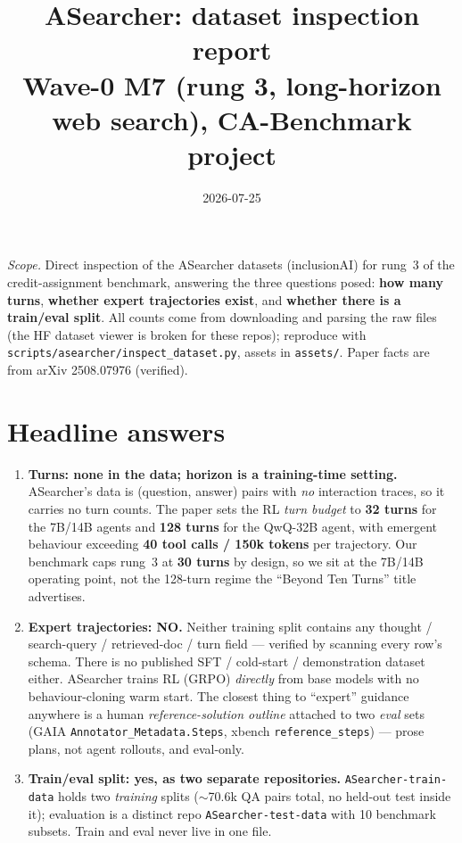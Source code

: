 \documentclass[10pt]{article}
\title{\vspace{-1.5cm}\textbf{ASearcher: dataset inspection report}\\[2pt]
\large Wave-0 M7 (rung 3, long-horizon web search), CA-Benchmark project}
\author{}
\date{2026-07-25}
\newcommand{\cmd}[1]{\texttt{\small #1}}
\begin{document}
\maketitle
\vspace{-0.6cm}

\noindent\small\textit{Scope.} Direct inspection of the ASearcher datasets (inclusionAI) for rung~3 of
the credit-assignment benchmark, answering the three questions posed: \textbf{how many turns},
\textbf{whether expert trajectories exist}, and \textbf{whether there is a train/eval split}. All counts
come from downloading and parsing the raw files (the HF dataset viewer is broken for these repos);
reproduce with \cmd{scripts/asearcher/inspect\_dataset.py}, assets in \cmd{assets/}. Paper facts are from
arXiv 2508.07976 (verified).\normalsize

\section{Headline answers}
\begin{enumerate}
\item \textbf{Turns: none in the data; horizon is a training-time setting.} ASearcher's data is
(question, answer) pairs with \emph{no} interaction traces, so it carries no turn counts. The paper sets
the RL \emph{turn budget} to \textbf{32 turns} for the 7B/14B agents and \textbf{128 turns} for the
QwQ-32B agent, with emergent behaviour exceeding \textbf{40 tool calls / 150k tokens} per trajectory. Our
benchmark caps rung~3 at \textbf{30 turns} by design, so we sit at the 7B/14B operating point, not the
128-turn regime the ``Beyond Ten Turns'' title advertises.
\item \textbf{Expert trajectories: NO.} Neither training split contains any thought / search-query /
retrieved-doc / turn field --- verified by scanning every row's schema. There is no published SFT /
cold-start / demonstration dataset either. ASearcher trains RL (GRPO) \emph{directly} from base models
with no behaviour-cloning warm start. The closest thing to ``expert'' guidance anywhere is a human
\emph{reference-solution outline} attached to two \emph{eval} sets (GAIA \cmd{Annotator\_Metadata.Steps},
xbench \cmd{reference\_steps}) --- prose plans, not agent rollouts, and eval-only.
\item \textbf{Train/eval split: yes, as two separate repositories.} \cmd{ASearcher-train-data} holds two
\emph{training} splits ($\sim$70.6k QA pairs total, no held-out test inside it); evaluation is a distinct
repo \cmd{ASearcher-test-data} with 10 benchmark subsets. Train and eval never live in one file.
\end{enumerate}
\end{document}
